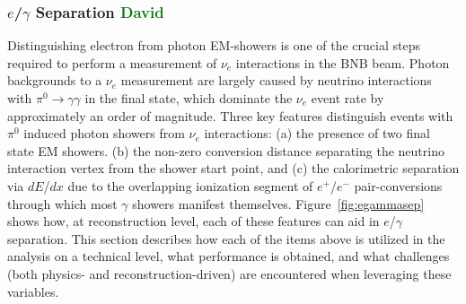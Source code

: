 \documentclass[a4paper]{article}
\begin{document}
\subsubsection{$e$/$\gamma$ Separation \textcolor{green}{David}}
\label{subsec:egammaspearation}
\par Distinguishing electron from photon EM-showers is one of the crucial steps required to perform a measurement of $\nu_e$ interactions in the BNB beam. Photon backgrounds to a $\nu_e$ measurement are largely caused by neutrino interactions with $\pi^0 \rightarrow \gamma\gamma$ in the final state, which dominate the $\nu_e$ event rate by approximately an order of magnitude. Three key features distinguish events with $\pi^0$ induced photon showers from $\nu_e$ interactions: (a) the presence of two final state EM showers. (b) the non-zero conversion distance separating the neutrino interaction vertex from the shower start point, and (c) the calorimetric separation via $dE$/$dx$ due to the overlapping ionization segment of $e^+$/$e^-$ pair-conversions through which most $\gamma$ showers manifest themselves. Figure~\ref{fig:egammasep} shows how, at reconstruction level, each of these features can aid in $e$/$\gamma$ separation. This section describes how each of the items above is utilized in the analysis on a technical level, what performance is obtained, and what challenges (both physics- and reconstruction-driven) are encountered when leveraging these variables.
\end{document}
